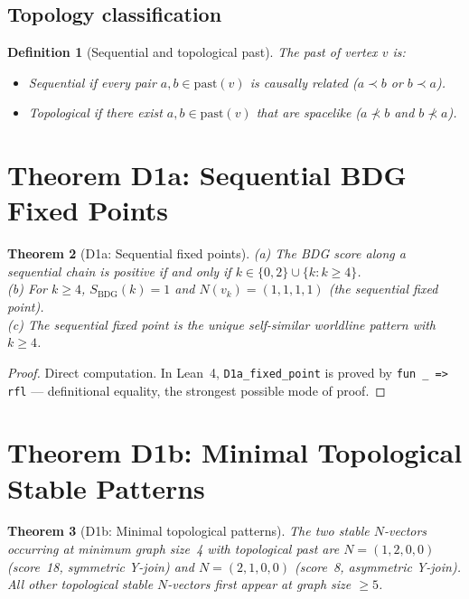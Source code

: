 \documentclass[11pt,a4paper]{article}
\newtheorem{theorem}{Theorem}[section]
\newtheorem{definition}[theorem]{Definition}
\newcommand{\SBDG}{S_{\mathrm{BDG}}}
\begin{document}
\subsection{Topology classification}

\begin{definition}[Sequential and topological past]
The past of vertex $v$ is:
\begin{itemize}
\item \emph{Sequential} if every pair $a,b\in\mathrm{past}(v)$ is causally related ($a\prec b$ or $b\prec a$).
\item \emph{Topological} if there exist $a,b\in\mathrm{past}(v)$ that are spacelike ($a\not\prec b$ and $b\not\prec a$).
\end{itemize}
\end{definition}

\section{Theorem D1a: Sequential BDG Fixed Points}

\begin{theorem}[D1a: Sequential fixed points]
\label{thm:D1a}
(a) The BDG score along a sequential chain is positive if and only if $k\in\{0,2\}\cup\{k:k\geq4\}$.\\
(b) For $k\geq4$, $\SBDG(k)=1$ and $N(v_k)=(1,1,1,1)$ (the sequential fixed point).\\
(c) The sequential fixed point is the unique self-similar worldline pattern with $k\geq4$.
\end{theorem}

\begin{proof}
Direct computation.  In Lean~4, \texttt{D1a\_fixed\_point} is proved by \texttt{fun \_ => rfl} ---
definitional equality, the strongest possible mode of proof.
\end{proof}

\section{Theorem D1b: Minimal Topological Stable Patterns}

\begin{theorem}[D1b: Minimal topological patterns]
\label{thm:D1b}
The two stable $N$-vectors occurring at minimum graph size~4 with topological past are
$N=(1,2,0,0)$ (score~18, symmetric Y-join) and $N=(2,1,0,0)$ (score~8, asymmetric Y-join).
All other topological stable $N$-vectors first appear at graph size $\geq5$.
\end{theorem}
\end{document}
